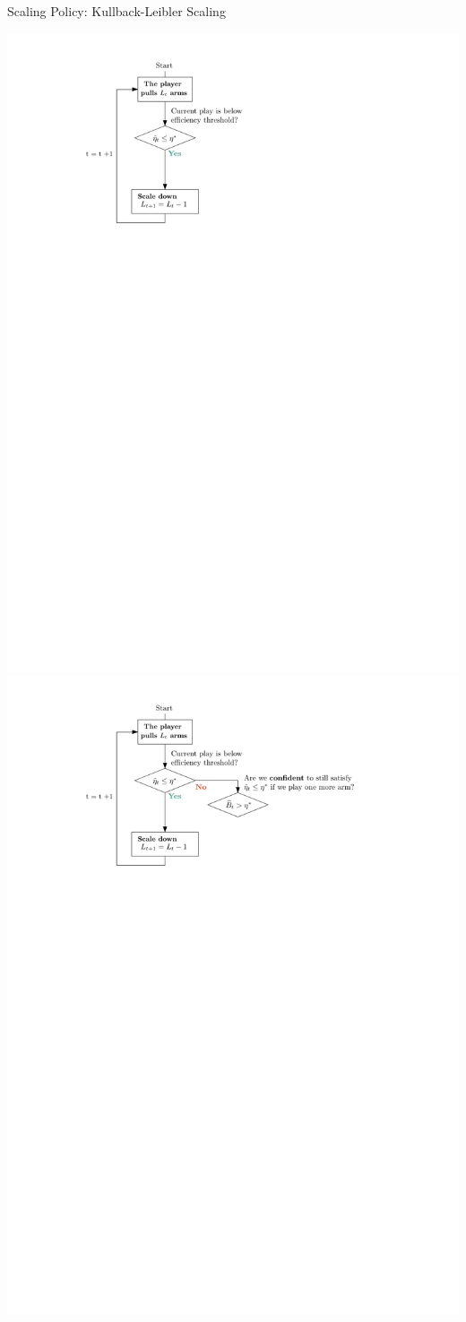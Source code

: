 \documentclass[16pt,usenames,dvipsnames, notheorems]{beamer}
\theoremstyle{definition}
\theoremstyle{example}
\theoremstyle{plain}
\begin{document}
\begin{frame}{Scaling Policy: Kullback-Leibler Scaling}
\begin{overprint}
	 \centering \includegraphics[width=0.9\linewidth]{figures/picture_scaling_4-compressed.pdf}
	\onslide<3> \centering \includegraphics[width=0.9\linewidth]{figures/picture_scaling_3-compressed.pdf}

\end{overprint}
\end{frame}
\end{document}
